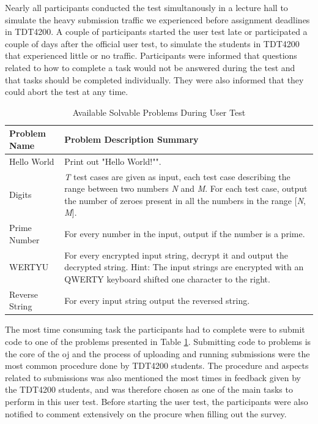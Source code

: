 Nearly all participants conducted the test simultanously in a lecture hall to simulate the heavy submission traffic we experienced before assignment deadlines in TDT4200. A couple of participants started the user test late or participated a couple of days after the official user test, to simulate the students in TDT4200 that experienced little or no traffic. Participants were informed that questions related to how to complete a task would not be answered during the test and that tasks should be completed individually. They were also informed that they could abort the test at any time. \\

\begin{table}
    \centering
    \begin{tabular}{ | l | p{6cm} |}
    \hline
    \textbf{Problem Name} & \textbf{Problem Description Summary} \\ \hline
    Hello World & Print out "Hello World!"". \\ \hline
    Digits & \textit{T} test cases are given as input, each test case describing the range between two numbers \textit{N} and \textit{M}. For each test case, output the number of zeroes present in all the numbers in the range [\textit{N}, \textit{M}]. \\ \hline
    Prime Number & For every number in the input, output if the number is a prime. \\ \hline
    WERTYU & For every encrypted input string, decrypt it and output the decrypted string. Hint: The input strings are encrypted with an QWERTY keyboard shifted one character to the right. \\ \hline
    Reverse String & For every input string output the reversed string. \\
    \hline
    \end{tabular}
    \caption{Available Solvable Problems During User Test}
    \label{tab:avail-prob}
\end{table}

The most time consuming task the participants had to complete were to submit code to one of the problems presented in Table \ref{tab:avail-prob}. Submitting code to problems is the core of the \gls{oj} and the process of uploading and running submissions were the most common procedure done by TDT4200 students. The procedure and aspects related to submissions was also mentioned the most times in feedback given by the TDT4200 students, and was therefore chosen as one of the main tasks to perform in this user test. Before starting the user test, the participants were also notified to comment extensively on the procure when filling out the survey. \\

